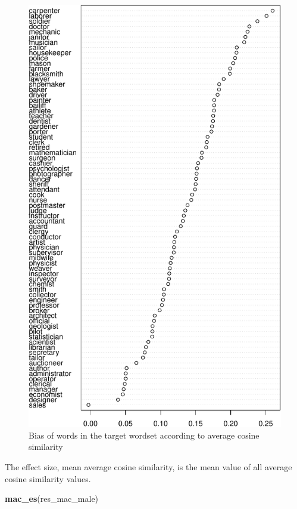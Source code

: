 \documentclass[english,man,mask]{apa6}
\newenvironment{Shaded}{\begin{snugshade}}{\end{snugshade}}
\newcommand{\KeywordTok}[1]{\textcolor[rgb]{0.13,0.29,0.53}{\textbf{#1}}}
\newcommand{\NormalTok}[1]{#1}
\begin{document}
\begin{figure}
\centering
\includegraphics{ica_files/figure-latex/acs-1.pdf}
\caption{\label{fig:acs}Bias of words in the target wordset according to average cosine similarity}
\end{figure}

The effect size, mean average cosine similarity, is the mean value of all average cosine similarity values.

\begin{Shaded}
\begin{Highlighting}[]
\KeywordTok{mac_es}\NormalTok{(res_mac_male)}
\end{Highlighting}
\end{Shaded}
\end{document}
